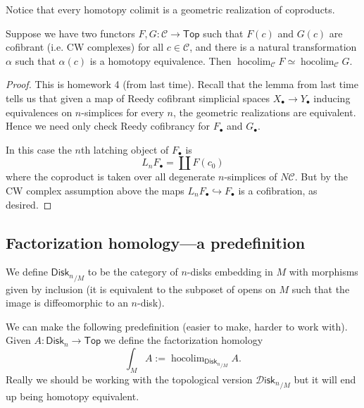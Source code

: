 \documentclass{amsart}
\DeclareMathOperator{\hocolim}{hocolim}
\newcommand{\disk}{\mathsf{Disk}_n}
\newcommand{\Disk}{\mathscr{D}\mathsf{isk}_n}
\begin{document}
Notice that every homotopy colimit is a geometric realization of coproducts.
\begin{theorem}[Homotopy invariance of $\hocolim$]
    Suppose we have two functors $F,G:\mathcal{C}\to\mathsf{Top}$ such that $F(c)$ and $G(c)$
    are cofibrant (i.e. CW complexes) for all $c\in\mathcal{C}$, and there is a
    natural transformation $\alpha$ such that $\alpha(c)$ is a homotopy equivalence.
    Then $\hocolim_\mathcal{C}F\simeq \hocolim_{\mathcal{C}}G$.
\end{theorem}
\begin{proof}
    This is homework 4 (from last time). Recall that the lemma from last time tells us
    that given a map of Reedy cofibrant simplicial spaces $X_\bullet\to Y_\bullet$ inducing
    equivalences on $n$-simplices for every $n$, the geometric realizations are equivalent.
    Hence we need only check Reedy cofibrancy for $F_\bullet$ and $G_\bullet$.

    In this case the $n$th latching object of $F_\bullet$ is
    \begin{equation*}
        L_n F_\bullet = \coprod F(c_0)
    \end{equation*}
    where the coproduct is taken over all degenerate $n$-simplices of $N\mathcal{C}$.
    But by the CW complex assumption above the maps $L_n F_\bullet\hookrightarrow F_\bullet$
    is a cofibration, as desired.
\end{proof}

\subsection{Factorization homology---a predefinition}

\begin{definition}
    We define ${\disk}_{/M}$ to be the category of $n$-disks embedding in $M$ with
    morphisms given by inclusion (it is equivalent to the subposet of opens on $M$
    such that the image is diffeomorphic to an $n$-disk).
\end{definition}

We can make the following predefinition (easier to make, harder to work with). Given
$A:\disk\to\mathsf{Top}$ we define the factorization homology 
\begin{equation*}
    \int_M A := \hocolim_{ {\disk}_{/M} } A.
\end{equation*}
Really we should be working with the topological version ${\Disk}_{/M}$ but it
will end up being homotopy equivalent.
\end{document}
